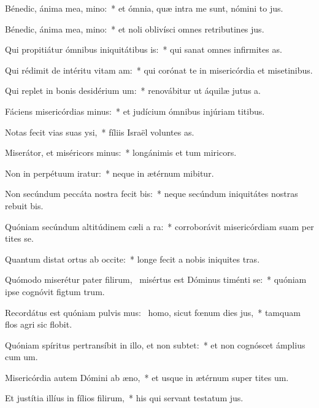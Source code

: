 \item Bénedic, ánima mea, mino:~* et ómnia, quæ intra me sunt, nómini to jus.
\item Bénedic, ánima mea, mino:~* et noli oblivísci omnes retributines jus.
\item Qui propitiátur ómnibus iniquitátibus is:~* qui sanat omnes infirmites as.
\item Qui rédimit de intéritu vitam am:~* qui corónat te in misericórdia et misetinibus.
\item Qui replet in bonis desidérium um:~* renovábitur ut áquilæ jutus a.
\item Fáciens misericórdias minus:~* et judícium ómnibus injúriam titibus.
\item Notas fecit vias suas ysi,~* fíliis Israël voluntes as.
\item Miserátor, et miséricors minus:~* longánimis et tum miricors.
\item Non in perpétuum iratur:~* neque in ætérnum mibitur.
\item Non secúndum peccáta nostra fecit bis:~* neque secúndum iniquitátes nostras rebuit bis.
\item Quóniam secúndum altitúdinem cæli a ra:~* corroborávit misericórdiam suam per tites se.
\item Quantum distat ortus ab occite:~* longe fecit a nobis iniquites tras.
\item Quómodo miserétur pater filirum,~\pscross{} misértus est Dóminus timénti se:~* quóniam ipse cognóvit figtum trum.
\item Recordátus est quóniam pulvis mus:~\pscross{} homo, sicut fœnum dies jus,~* tamquam flos agri sic flobit.
\item Quóniam spíritus pertransíbit in illo, et non subtet:~* et non cognóscet ámplius cum um.
\item Misericórdia autem Dómini ab æno,~* et usque in ætérnum super tites um.
\item Et justítia illíus in fílios filirum,~* his qui servant testatum jus.
